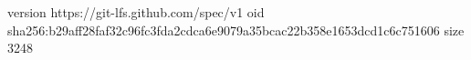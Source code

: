 version https://git-lfs.github.com/spec/v1
oid sha256:b29aff28faf32c96fc3fda2cdca6e9079a35bcac22b358e1653dcd1c6c751606
size 3248
